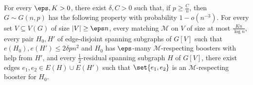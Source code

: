 \documentclass[10pt,a4paper,reqno]{amsart}
\begin{document}
\begin{lemma}
  \label{lem:many-boosters-in-residual}
  For every $\eps, K > 0$, there exist $\delta, C > 0$ such that, if $p \geq \frac{C}{n}$, then $G \sim G(n, p)$ has the following property with probability $1 - o(n^{-3})$. For every set $V \subseteq V(G)$ of size $|V|\ge \eps n$, every matching $\mathcal{M}$ on $V$ of size at most $\frac{K n}{\log{n}}$, every pair $H_0, H'$ of edge-disjoint spanning subgraphs of $G[V]$ such that $e(H_0), e(H') \leq 2\delta pn^2$ and $H_0$ has $\eps$-many $\mathcal{M}$-respecting boosters with help from $H'$, and every $\frac{1}{2}$-residual spanning subgraph $H$ of $G[V]$, there exist edges $e_1, e_2 \in E(H) \cup E(H')$ such that $\set{e_1, e_2}$ is an $\mathcal{M}$-respecting booster for $H_0$.
\end{lemma}
\end{document}
